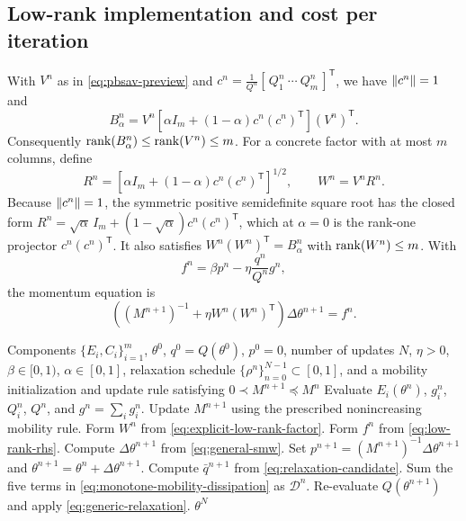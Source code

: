 \subsection{Low-rank implementation and cost per iteration}
\label{sec:low-rank-realization}

With \(V^n\) as in \cref{eq:pbsav-preview} and
\(c^n=\tfrac1{Q^n}[\,Q_1^n\ \cdots\ Q_m^n\,]^{\mathsf T}\), we have
\(\left\lVert c^n\right\rVert=1\) and
\begin{equation}
  B_\alpha^n
  =V^n\left[\alpha I_m+(1-\alpha)c^n(c^n)^{\mathsf T}\right](V^n)^{\mathsf T}.
  \label{eq:true-rank-factor}
\end{equation}
Consequently \(\operatorname{rank}(B_\alpha^n)\leq\operatorname{rank}(V^n)\leq m\).  For a concrete
factor with at most \(m\) columns, define
\begin{equation}
  R^n=\left[\alpha I_m+(1-\alpha)c^n(c^n)^{\mathsf T}\right]^{1/2},
  \qquad
  W^n=V^nR^n.
  \label{eq:explicit-low-rank-factor}
\end{equation}
Because \(\left\lVert c^n\right\rVert=1\), the symmetric positive semidefinite square root has
the closed form
\(R^n=\sqrt{\alpha}\,I_m+(1-\sqrt{\alpha})c^n(c^n)^{\mathsf T}\), which at
\(\alpha=0\) is the rank-one projector \(c^n(c^n)^{\mathsf T}\).  It also
satisfies
\(W^n(W^n)^{\mathsf T}=B_\alpha^n\) with \(\operatorname{rank}(W^n)\leq m\).  With
\begin{equation}
  f^n=\beta p^n-\eta\frac{q^n}{Q^n}g^n,
  \label{eq:low-rank-rhs}
\end{equation}
the momentum equation is
\begin{equation}
  \left((M^{n+1})^{-1}+\eta W^n(W^n)^{\mathsf T}\right)
  \Delta\theta^{n+1}=f^n.
  \label{eq:low-rank-system}
\end{equation}

\begin{algorithm}[!ht]
\caption{Relaxed PB--SAV momentum with nonincreasing mobility. Use
\(M^n\equiv I_d\) for Euclidean momentum; for the AMSGrad-type mobility use
\(v^0=\overline v^0=0\) and \(M^0=\epsilon^{-1}I_d\).}
\label{alg:pbsav}
\begin{algorithmic}[1]
\Require Components \(\{E_i,C_i\}_{i=1}^m\), \(\theta^0\),
\(q^0=Q(\theta^0)\), \(p^0=0\), number of updates \(N\), \(\eta>0\),
\(\beta\in[0,1)\), \(\alpha\in[0,1]\), relaxation schedule
\(\{\rho^n\}_{n=0}^{N-1}\subset[0,1]\), and a mobility initialization and
update rule satisfying \(0\prec M^{n+1}\preceq M^n\)
  \State Evaluate \(E_i(\theta^n)\), \(g_i^n\), \(Q_i^n\), \(Q^n\), and
  \(g^n=\sum_i g_i^n\).
  \State Update \(M^{n+1}\) using the prescribed nonincreasing mobility rule.
  \State Form \(W^n\) from \cref{eq:explicit-low-rank-factor}.
  \State Form \(f^n\) from \cref{eq:low-rank-rhs}.
  \State Compute \(\Delta\theta^{n+1}\) from \cref{eq:general-smw}.
  \State Set \(p^{n+1}=(M^{n+1})^{-1}\Delta\theta^{n+1}\) and
  \(\theta^{n+1}=\theta^n+\Delta\theta^{n+1}\).
  \State Compute \(\bar q^{n+1}\) from \cref{eq:relaxation-candidate}.
  \State Sum the five terms in
  \cref{eq:monotone-mobility-dissipation} as \(\mathcal D^n\).
  \State Re-evaluate \(Q(\theta^{n+1})\) and apply
  \cref{eq:generic-relaxation}.
\EndFor
\Ensure \(\theta^N\)
\end{algorithmic}
\end{algorithm}

